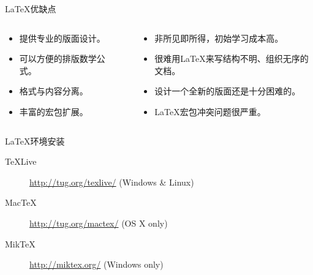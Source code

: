 \documentclass[langauge=chinese]{hustbeamer}
\begin{document}
\begin{frame}{\secname}{\textrm{\LaTeX}优缺点}
\begin{columns}
\begin{column}[t]{0.5\textwidth}
\begin{itemize}[<+->]
    \item 提供专业的版面设计。
    \item 可以方便的排版数学公式。
    \item 格式与内容分离。
    \item 丰富的宏包扩展。
\end{itemize}
\end{column}
~
\begin{column}[t]{0.5\textwidth}
\begin{itemize}[<+->]
    \item 非所见即所得，初始学习成本高。
    \item 很难用\textrm{\LaTeX}来写结构不明、组织无序的文档。
    \item 设计一个全新的版面还是十分困难的。
    \item \textrm{\LaTeX}宏包冲突问题很严重。
\end{itemize}
\end{column}
\end{columns}
\end{frame}

\begin{frame}{\secname}{\textrm{\LaTeX}环境安装}
\begin{description}
    \item[TeXLive] \url{http://tug.org/texlive/} (Windows \& Linux)
    \item[MacTeX] \url{http://tug.org/mactex/} (OS X only)
    \item[MikTeX] \url{http://miktex.org/} (Windows only)
\end{description}
\parbox[t][1cm][t]{\textwidth}{
}
\end{frame}
\end{document}
